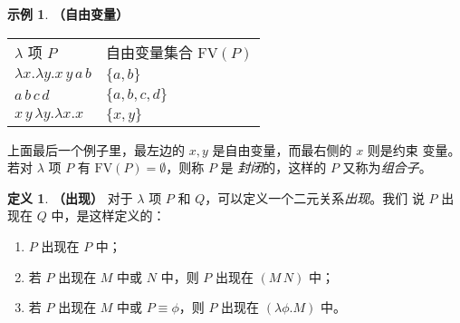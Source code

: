 \documentclass[a4paper,adobefonts]{ctexart}
\newenvironment{tightenum}{
  \begin{enumerate}
    \setlength{\itemindent}{2\ccwd}
    \setlength{\itemsep}{0cm}
    \setlength{\parskip}{0cm}
}{
  \end{enumerate}
}
\theoremstyle{definition}
\newtheorem{definition}{定义}
\newtheorem{example}{示例}
\begin{document}
\begin{example}{\bfseries{（自由变量）}}
  \begin{center}
    \begin{tabular*}{.7\textwidth}{@{\extracolsep{\fill} }ll}
      $\lambda$ 项 $P$ & 自由变量集合 $\text{FV}(P)$\\
      $\lambda x.\lambda y.x\,y\,a\,b$ & $\{a,b\}$\\
      $a\,b\,c\,d$ & $\{a,b,c,d\}$\\
      $x\,y\,\lambda y.\lambda x.x$ & $\{x,y\}$
    \end{tabular*}
  \end{center}
\end{example}

上面最后一个例子里，最左边的 $x,y$ 是自由变量，而最右侧的 $x$ 则是约束
变量。若对 $\lambda$ 项 $P$ 有 $\text{FV}(P)=\emptyset$，则称 $P$ 是
\emph{封闭}的，这样的 $P$ 又称为\emph{组合子}。

\begin{definition}{\bfseries{（出现）}}
  对于 $\lambda$ 项 $P$ 和 $Q$，可以定义一个二元关系\emph{出现}。我们
  说 $P$ 出现在 $Q$ 中，是这样定义的：
  \begin{tightenum}
  \item $P$ 出现在 $P$ 中；
  \item 若 $P$ 出现在 $M$ 中或 $N$ 中，则 $P$ 出现在 $(M\,N)$ 中；
  \item 若 $P$ 出现在 $M$ 中或 $P\equiv\phi$，则 $P$ 出现在 $(\lambda\phi.M)$ 中。
  \end{tightenum}
\end{definition}
\end{document}
